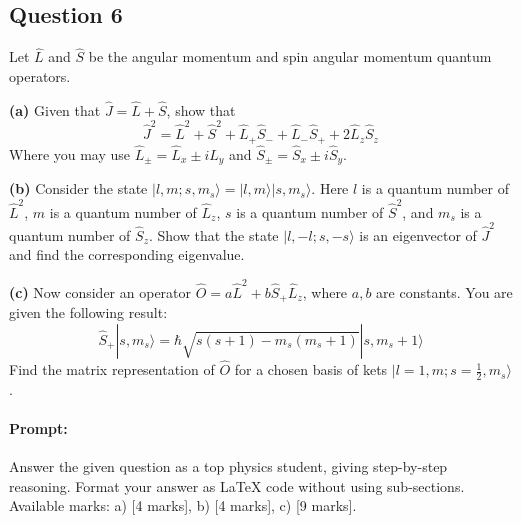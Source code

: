 \documentclass{article}
\begin{document}
\subsection{Question 6}

Let \(\hat{L}\) and \(\hat{S}\) be the angular momentum and spin angular momentum quantum operators.

\textbf{(a)} Given that \(\hat{J} = \hat{L} + \hat{S}\), show that
\[
\hat{J}^2 = \hat{L}^2 + \hat{S}^2 + \hat{L}_+ \hat{S}_- + \hat{L}_- \hat{S}_+ + 2 \hat{L}_z \hat{S}_z
\]
Where you may use \(\hat{L}_\pm = \hat{L}_x \pm i \hat{L}_y\) and \(\hat{S}_\pm = \hat{S}_x \pm i \hat{S}_y\).

\textbf{(b)} Consider the state \(|l, m; s, m_s\rangle = |l, m\rangle |s, m_s\rangle\). Here \(l\) is a quantum number of \(\hat{L}^2\), \(m\) is a quantum number of \(\hat{L}_z\), \(s\) is a quantum number of \(\hat{S}^2\), and \(m_s\) is a quantum number of \(\hat{S}_z\). Show that the state \(|l, -l; s, -s\rangle\) is an eigenvector of \(\hat{J}^2\) and find the corresponding eigenvalue.

\textbf{(c)} Now consider an operator \(\hat{O} = a \hat{L}^2 + b \hat{S}_+ \hat{L}_z\), where \(a, b\) are constants. You are given the following result:
\[
\hat{S}_+ |s, m_s\rangle = \hbar \sqrt{s(s+1) - m_s(m_s + 1)} |s, m_s + 1\rangle
\]
Find the matrix representation of \(\hat{O}\) for a chosen basis of kets \(|l = 1, m; s = \frac{1}{2}, m_s\rangle\).

\paragraph{Prompt: \\} 
Answer the given question as a top physics student, giving step-by-step reasoning. Format your answer as LaTeX code without using sub-sections. Available marks: a) [4 marks], b) [4 marks], c) [9 marks].
\end{document}
